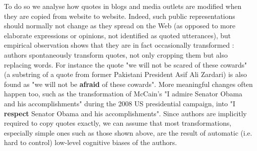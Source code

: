 \documentclass[english,]{article}
\begin{document}
To do so we analyse how quotes in blogs and media outlets are modified when they are copied from website to website.
Indeed, such public representations should normally not change as they spread on the Web (as opposed to more elaborate expressions or opinions, not identified as quoted utterances), but empirical observation shows that they are in fact occasionally transformed \autocite{simmons_memes_2011}:
authors spontaneously transform quotes, not only cropping them but also replacing words.
For instance the quote "we will not be scared of these cowards" (a substring of a quote from former Pakistani President Asif Ali Zardari) is also found as "we will not be \textbf{afraid} of these cowards".
More meaningful changes often happen too, such as the transformation of McCain's "I admire Senator Obama and his accomplishments" during the 2008 US presidential campaign, into "I \textbf{respect} Senator Obama and his accomplishments".
Since authors are implicitly required to copy quotes exactly, we can assume that most transformations, especially simple ones such as those shown above, are the result of automatic (i.e. hard to control) low-level cognitive biases of the authors.
\end{document}
